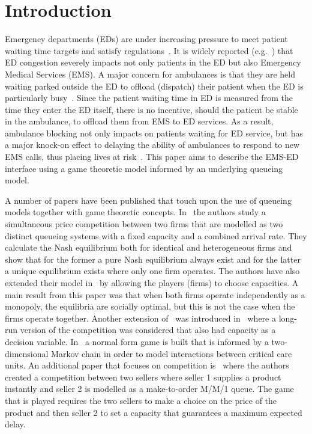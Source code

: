 \section{Introduction}


Emergency departments (EDs) are under increasing pressure to meet patient
waiting time targets and satisfy 
regulations~\cite{EmergencyDepartmentWinterPressures}.
It is widely reported (e.g.~\cite{mirror, thenews, bmj}) that ED congestion 
severely impacts not only patients in the ED but also Emergency Medical 
Services (EMS).
A major concern for ambulances is that they are held waiting parked outside the
ED to offload (dispatch) their patient when the ED is particularly 
busy~\cite{clarey2014ambulance}. 
Since the patient waiting time in ED is measured from the time they enter the
ED itself, there is no incentive, should the patient be stable in the
ambulance, to offload them from EMS to ED services.
As a result, ambulance blocking not only impacts on patients waiting for ED
service, but has a major knock-on effect to delaying the ability of ambulances
to respond to new EMS calls, thus placing lives at risk~\cite{eastanglia}.
This paper aims to describe the EMS-ED interface using a game theoretic model
informed by an underlying queueing model. 

A number of papers have been published that touch upon the use of 
queueing models together with game theoretic concepts.
In~\cite{FirmCompetition} the authors study a simultaneous price competition 
between two firms that are modelled as two distinct queueing systems with a 
fixed capacity and a combined arrival rate.
They calculate the Nash equilibrium both for identical and heterogeneous firms
and show that for the former a pure Nash equilibrium always exist and for the 
latter a unique equilibrium exists where only one firm operates.
The authors have also extended their model in~\cite{FirmCompetition2} by 
allowing the players (firms) to choose capacities. 
A main result from this paper was that when both firms operate independently as
a monopoly, the equilibria are socially optimal, but this is not the case when
the firms operate together.
Another extension of~\cite{FirmCompetition} was introduced 
in~\cite{FirmCompetitionExtension} where a long-run version of the competition 
was considered that also had capacity as a decision variable.
In~\cite{knight2017measuring} a normal form game is built that is informed by a 
two-dimensional Markov chain in order to model interactions between critical
care units.
An additional paper that focuses on competition is~\cite{fan2009short} where
the authors created a competition between two sellers where seller 1 supplies 
a product instantly and seller 2 is modelled as a make-to-order M/M/1 queue.
The game that is played requires the two sellers to make a choice on the price 
of the product and then seller 2 to set a capacity that guarantees a maximum 
expected delay.

